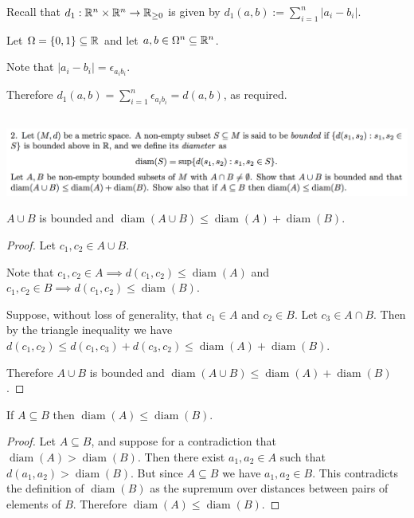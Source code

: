 \documentclass[12pt]{article}
\DeclareMathOperator{\diam}{\mathrm{diam}}
\begin{document}
Recall that $d_1:\mathbb{R}^n\times\mathbb{R}^n\to\mathbb{R}_{\geq 0}$ is given by $d_1(a, b) := \sum_{i=1}^n|a_i - b_i|$.

Let $\Omega = \{0, 1\} \subseteq \mathbb{R}$ and let $a, b \in \Omega^n \subseteq \mathbb{R}^n$.

Note that $|a_i - b_i| = \epsilon_{a_ib_i}$.

Therefore $d_1(a, b) = \sum_{i=1}^n\epsilon_{a_ib_i} = d(a, b)$, as required.

\newpage
\subsection{}
\begin{mdframed}
\includegraphics[width=400pt]{img/oxford-a2-1-2.png}
\end{mdframed}

\begin{claim*}
  $A \cup B$ is bounded and $\diam(A \cup B) \leq \diam(A) + \diam(B)$.
\end{claim*}

\begin{proof}
  Let $c_1, c_2 \in A \cup B$.

  Note that $c_1, c_2 \in A \implies d(c_1, c_2) \leq \diam(A)$ and
  $c_1, c_2 \in B \implies d(c_1, c_2) \leq \diam(B)$.

  Suppose, without loss of generality, that $c_1 \in A$ and $c_2 \in B$. Let $c_3 \in A \cap
  B$. Then by the triangle inequality we have
  $d(c_1, c_2) \leq d(c_1, c_3) + d(c_3, c_2) \leq \diam(A) + \diam(B)$.

  Therefore $A \cup B$ is bounded and $\diam(A \cup B) \leq \diam(A) + \diam(B)$.
\end{proof}


\begin{claim*}
  If $A \subseteq B$ then $\diam(A) \leq \diam(B)$.
\end{claim*}

\begin{proof}
  Let $A \subseteq B$, and suppose for a contradiction that $\diam(A) > \diam(B)$. Then there exist
  $a_1, a_2 \in A$ such that $d(a_1, a_2) > \diam(B)$. But since $A \subseteq B$ we have
  $a_1, a_2 \in B$. This contradicts the definition of $\diam(B)$ as the supremum over distances
  between pairs of elements of $B$. Therefore $\diam(A) \leq \diam(B)$.
\end{proof}
\end{document}

